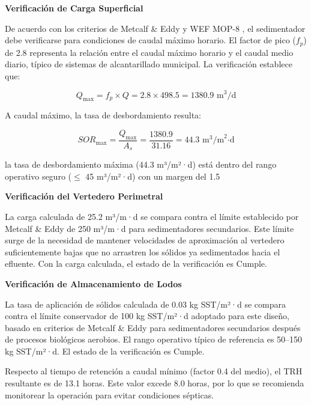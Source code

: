 \documentclass[12pt,a4paper]{article}
\begin{document}
\textbf{Verificación de Carga Superficial}

De acuerdo con los criterios de Metcalf \& Eddy \cite{metcalf2014} y WEF MOP-8 \cite{wef_mop8_2010}, el sedimentador debe verificarse para condiciones de caudal máximo horario. El factor de pico ($f_p$) de 2.8 representa la relación entre el caudal máximo horario y el caudal medio diario, típico de sistemas de alcantarillado municipal. La verificación establece que:

\begin{equation}
Q_{\max} = f_p \times Q = 2.8 \times 498.5 = 1380.9 \text{ m}^3\text{/d}
\end{equation}

A caudal máximo, la tasa de desbordamiento resulta:

\begin{equation}
SOR_{\max} = \frac{Q_{\max}}{A_s} = \frac{1380.9}{31.16} = 44.3 \text{ m}^3\text{/m}^2\text{·d}
\end{equation}

la tasa de desbordamiento máxima (44.3 m³/m²·d) está dentro del rango operativo seguro ($\leq$ 45 m³/m²·d) con un margen del 1.5%

\textbf{Verificación del Vertedero Perimetral}

La carga calculada de 25.2 m³/m·d se compara contra el límite establecido por Metcalf & Eddy de 250 m³/m·d para sedimentadores secundarios. Este límite surge de la necesidad de mantener velocidades de aproximación al vertedero suficientemente bajas que no arrastren los sólidos ya sedimentados hacia el efluente. Con la carga calculada, el estado de la verificación es Cumple.

\textbf{Verificación de Almacenamiento de Lodos}

La tasa de aplicación de sólidos calculada de 0.03 kg SST/m²·d se compara contra el límite conservador de 100 kg SST/m²·d adoptado para este diseño, basado en criterios de Metcalf & Eddy para sedimentadores secundarios después de procesos biológicos aerobios. El rango operativo típico de referencia es 50--150 kg SST/m²·d. El estado de la verificación es Cumple.

Respecto al tiempo de retención a caudal mínimo (factor 0.4 del medio), el TRH resultante es de 13.1 horas. Este valor excede 8.0 horas, por lo que se recomienda monitorear la operación para evitar condiciones sépticas.
\end{document}
